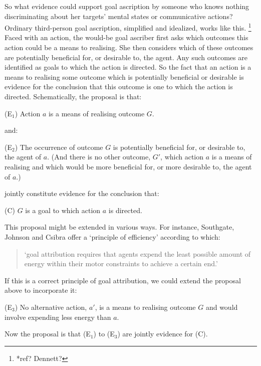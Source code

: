 \documentclass[14pt,a4paper]{extarticle}
\begin{document}
So what evidence could support goal ascription by someone who knows nothing discriminating about her targets' mental states or communicative actions?
Ordinary third-person goal ascription, simplified and idealized, works like this.%
\footnote{
*ref? Dennett?
}
Faced with an action,
the would-be goal ascriber first asks which outcomes this action could be a means to realising.
She then considers which of these outcomes are potentially beneficial for, or desirable to, the agent.
Any such outcomes are identified as goals to which the action is directed.
So the fact that an action is a means to realising some outcome which is potentially beneficial or desirable is evidence for the conclusion that this outcome is one to which the action is directed.
Schematically, the proposal is that:
%
\begin{idescription}
\item[(E$_1$)] Action $a$ is a means of realising outcome $G$.
\end{idescription}
%
and:
%
\begin{idescription}
\item[(E$_2$)] The occurrence of outcome $G$ is potentially beneficial for, or desirable to, the agent of $a$.
(And there is no other outcome, $G'$, which action $a$ is a means of realising and which would be more beneficial for, or more desirable to, the agent of $a$.)
\end{idescription}
%
jointly constitute evidence for the conclusion that:
%
\begin{idescription}
\item[(C)] $G$ is a goal to which action $a$ is directed.
\end{idescription}

This proposal might be extended in various ways.
For instance, Southgate, Johnson and Csibra offer a `principle of efficiency' according to which:
%
\begin{quote}
`goal attribution requires that agents expend the least possible amount of energy within their motor constraints to achieve a certain end.'
\citep[p.\ *]{Southgate:2008el}
\end{quote}
%
If this is a correct principle of goal attribution, we could extend the proposal above to incorporate it:
%
\begin{idescription}
\item[(E$_3$)] No alternative action, $a'$, is a means to realising outcome $G$ and would involve expending less energy than $a$.
\end{idescription}
%
Now the proposal is that (E$_1$) to (E$_3$) are jointly evidence for (C).
\end{document}
